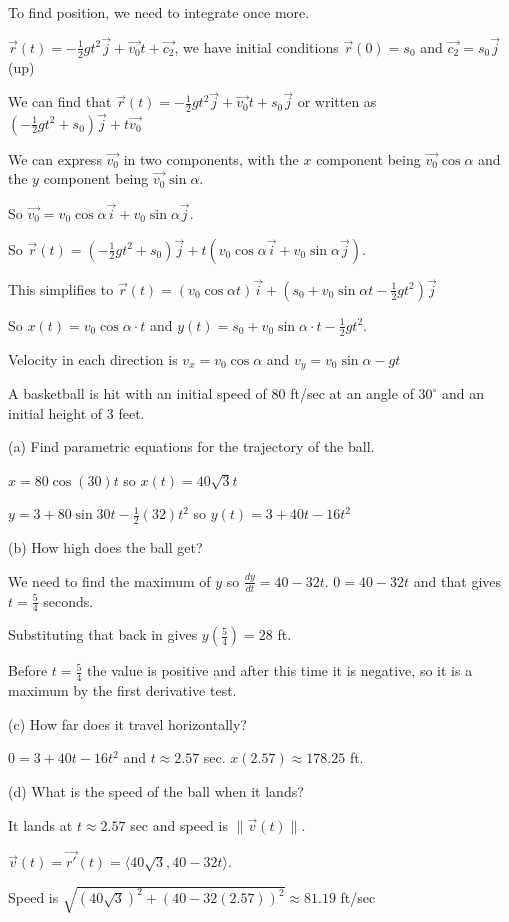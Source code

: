 \documentclass[../calc3.tex]{subfiles}
\begin{document}
To find position, we need to integrate once more.

$\vec{r}(t)= -\frac{1}{2}gt^2\vec{j}+\vec{v_0}t+\vec{c_2}$, we have initial conditions $\vec{r}(0)=s_0$ and $\vec{c_2}=s_0 \vec{j}$ (up)

We can find that $\vec{r}(t)=-\frac{1}{2}gt^2\vec{j}+\vec{v_0}t+s_0\vec{j}$ or written as $\left( -\frac{1}{2}gt^2+s_0\right)\vec{j}+t\vec{v_0}$

We can express $\vec{v_0}$ in two components, with the $x$ component being $\vec{v_0}\cos\alpha$ and the $y$ component being $\vec{v_0}\sin\alpha$.

So $\vec{v_0} = v_0\cos\alpha \vec{i}+v_0\sin\alpha \vec{j}$.

So $\vec{r}(t)=\left(-\frac{1}{2}gt^2+s_0\right)\vec{j}+t(v_0\cos\alpha \vec{i}+v_0\sin\alpha\vec{j})$.

This simplifies to $\vec{r}(t)=(v_0\cos\alpha t)\vec{i}+(s_0+v_0\sin\alpha t-\frac{1}{2}gt^2)\vec{j}$

So $x(t)=v_0\cos \alpha \cdot t$ and $y(t)=s_0+v_0\sin\alpha \cdot t-\frac{1}{2}gt^2$.

Velocity in each direction is $v_x = v_0\cos\alpha$ and $v_y=v_0\sin\alpha-gt$

\begin{example}
    A basketball is hit with an initial speed of 80 ft/sec at an angle of $30^{\circ}$ and an initial height of 3 feet. 

    (a) Find parametric equations for the trajectory of the ball.

    $x=80\cos(30)t$ so $x(t)=40\sqrt{3}t$

    $y=3+80\sin 30 t-\frac{1}{2}(32)t^2$ so $y(t)=3+40t-16t^2$

    (b) How high does the ball get?

    We need to find the maximum of $y$ so $\frac{dy}{dt}=40-32t$. $0=40-32t$ and that gives $t=\frac{5}{4}$ seconds.

    Substituting that back in gives $y\left(\frac{5}{4}\right) = 28$ ft.

    Before $t=\frac{5}{4}$ the value is positive and after this time it is negative, so it is a maximum by the first derivative test.

    (c) How far does it travel horizontally?

    $0=3+40t-16t^2$ and $t\approx 2.57$ sec. $x(2.57)\approx 178.25$ ft.

    (d) What is the speed of the ball when it lands?

    It lands at $t\approx 2.57$ sec and speed is $\| \vec{v}(t)\|$.

    $\vec{v}(t)=\vec{r'}(t)=\langle 40\sqrt{3},40-32t\rangle$.

    Speed is $\sqrt{(40\sqrt{3})^2+(40-32(2.57))^2} \approx 81.19$ ft/sec
\end{example}
\end{document}
